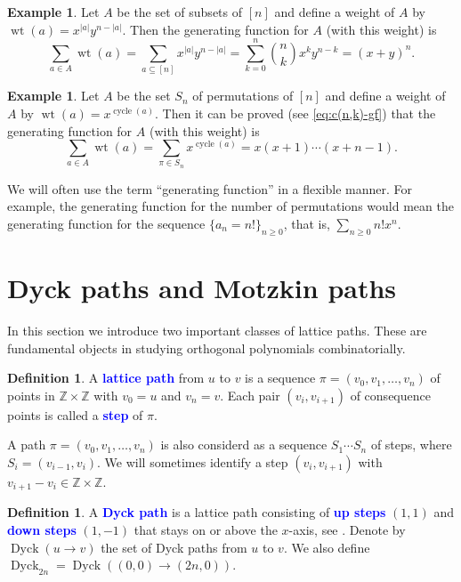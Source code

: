\documentclass[oneside]{book}
\numberwithin{equation}{section}
\theoremstyle{definition}
\newtheorem{exam}[thm]{Example}
\newtheorem{defn}[thm]{Definition}
\newcommand\cycle{\operatorname{cycle}}
\newcommand{\ZZ}{\mathbb{Z}}
\newcommand{\Dyck}{\operatorname{Dyck}}
\newcommand\wt{\operatorname{wt}}
\renewcommand\emph[1]{\textcolor{blue}{\bf #1}}
\begin{document}
\begin{exam}
  Let \( A \) be the set of subsets of \( [n] \) and define a weight
  of \( A \) by \( \wt(a) = x^{|a|}y^{n-|a|} \). Then the generating function for
  \( A \) (with this weight) is
  \[
    \sum_{a \in A} \wt(a) = \sum_{a\subseteq [n]} x^{|a|} y^{n-|a|} =
    \sum_{k=0}^n \binom{n}{k} x^{k}y^{n-k} = (x+y)^n.
  \]
\end{exam}

\begin{exam}
  Let \( A \) be the set \( S_n \) of permutations of \( [n] \) and
  define a weight of \( A \) by \( \wt(a) = x^{\cycle(a)} \). Then it
  can be proved (see \eqref{eq:c(n,k)-gf}) that the generating
  function for \( A \) (with this weight) is
  \[
    \sum_{a \in A} \wt(a) = \sum_{\pi\in S_n} x^{\cycle(a)} = x(x+1)
    \cdots (x+n-1).
  \]
\end{exam}

We will often use the term ``generating function'' in a flexible
manner. For example, the generating function for the number of
permutations would mean the generating function for the sequence
\( \{a_n = n!\}_{n\ge0} \), that is, \( \sum_{n\ge0} n! x^n \).

\section{Dyck paths and Motzkin paths}

In this section we introduce two important classes of lattice paths.
These are fundamental objects in studying orthogonal polynomials
combinatorially.


\begin{defn}
  A \emph{lattice path} from \( u \) to \( v \) is a sequence
  \( \pi = (v_0,v_1,\dots,v_n) \) of points in \( \ZZ\times\ZZ \) with
  \( v_0=u \) and \( v_n =v \). Each pair \( (v_i,v_{i+1}) \) of
  consequence points is called a \emph{step} of \( \pi \). 
\end{defn}

A path \( \pi = (v_0,v_1,\dots,v_n) \) is also considerd as a sequence
\( S_1 \cdots S_n \) of steps, where \( S_i=(v_{i-1},v_i) \). We will
sometimes identify a step \( (v_i,v_{i+1}) \) with
\( v_{i+1} - v_i \in \ZZ\times\ZZ \).

\begin{defn}
  A \emph{Dyck path} is a lattice path consisting of \emph{up steps}
  \( (1,1) \) and \emph{down steps} \( (1,-1) \) that stays on or
  above the \( x \)-axis, see . Denote by
  \( \Dyck(u\to v) \) the set of Dyck paths from \( u \) to \( v \).
  We also define \( \Dyck_{2n} = \Dyck((0,0)\to (2n,0))\).
\end{defn}
\end{document}
